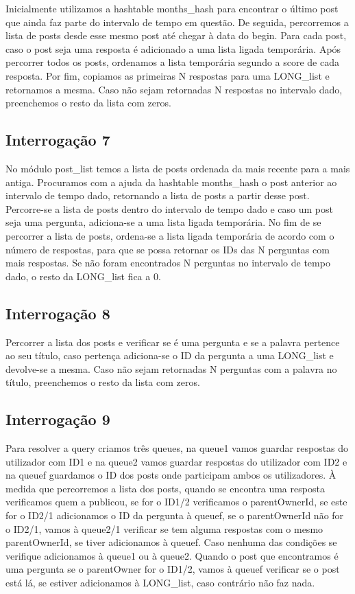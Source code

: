 \documentclass[10pt]{article}
\begin{document}
	Inicialmente utilizamos a hashtable months\_hash para encontrar o último post que ainda faz parte do intervalo de tempo em questão. De seguida, percorremos a lista de posts desde esse mesmo post até chegar à data do begin. Para cada post, caso o post seja uma resposta é adicionado a uma lista ligada temporária. Após percorrer todos os posts, ordenamos a lista temporária segundo a score de cada resposta. Por fim, copiamos as primeiras N respostas para uma LONG\_list e retornamos a mesma. Caso não sejam retornadas N respostas no intervalo dado, preenchemos o resto da lista com zeros.

\subsection{Interrogação 7}

	No módulo post\_list temos a lista de posts ordenada da mais recente para a mais antiga.
	Procuramos com a ajuda da hashtable months\_hash o post anterior ao intervalo de tempo dado, retornando a lista de posts a partir desse post.
	Percorre-se a lista de posts dentro do intervalo de tempo dado e caso um post seja uma pergunta, adiciona-se a uma lista ligada temporária.	
	No fim de se percorrer a lista de posts, ordena-se a lista ligada temporária de acordo com o número de respostas, para que se possa retornar os IDs das N perguntas com mais respostas.
	Se não foram encontrados N perguntas no intervalo de tempo dado, o resto da LONG\_list fica a 0.

\subsection{Interrogação 8}

	Percorrer a lista dos posts e verificar se é uma pergunta e se a palavra pertence ao seu título, caso pertença adiciona-se o ID da pergunta a uma LONG\_list e devolve-se a mesma. Caso não sejam retornadas N perguntas com a palavra no título, preenchemos o resto da lista com zeros.

\subsection{Interrogação 9}

	Para resolver a query criamos três queues, na queue1 vamos guardar respostas do utilizador com ID1 e na queue2 vamos guardar respostas do utilizador com ID2 e na queuef guardamos o ID dos posts onde participam ambos os utilizadores. À medida que percorremos a lista dos posts, quando se encontra uma resposta verificamos quem a publicou, se for o ID1/2 verificamos o parentOwnerId, se este for o ID2/1 adicionamos o ID da pergunta à queuef, se o parentOwnerId não for o ID2/1, vamos à queue2/1 verificar se tem alguma respostas com o mesmo parentOwnerId, se tiver adicionamos à queuef. Caso nenhuma das condições se verifique adicionamos à queue1 ou à queue2. Quando o post que encontramos é uma pergunta se o parentOwner for o ID1/2, vamos à queuef verificar se o post está lá, se estiver adicionamos à LONG\_list, caso contrário não faz nada.
\end{document}
